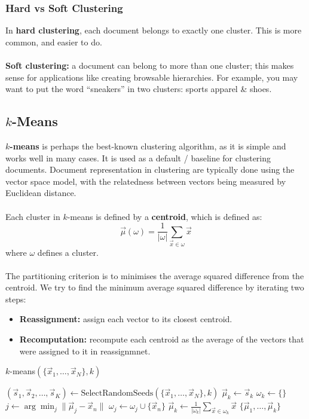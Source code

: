 \documentclass[a4paper,11pt]{article}
\begin{document}
\subsubsection{Hard vs Soft Clustering}
In \textbf{hard clustering}, each document belongs to exactly one cluster.
This is more common, and easier to do.
\\\\
\textbf{Soft clustering:} a document can belong to more than one cluster;
this makes sense for applications like creating browsable hierarchies.
For example, you may want to put the word ``sneakers'' in two clusters: sports apparel \& shoes.

\subsection{$k$-Means}
\textbf{$k$-means} is perhaps the best-known clustering algorithm, as it is simple and works well in many cases.
It is used as a default / baseline for clustering documents.
Document representation in clustering are typically done using the vector space model, with the relatedness between vectors being measured by Euclidean distance.
\\\\
Each cluster in $k$-means is defined by a \textbf{centroid}, which is defined as:
\[
    \overrightarrow{\mu}(\omega) = \frac{1}{| \omega | }\sum_{\overrightarrow{x} \in \omega} \overrightarrow{x}
\]
where $\omega$ defines a cluster.
\\\\
The partitioning criterion is to minimises the average squared difference from the centroid.
We try to find the minimum average squared difference by iterating two steps:
\begin{itemize}
    \item   \textbf{Reassignment:} assign each vector to its closest centroid.
    \item   \textbf{Recomputation:} recompute each centroid as the average of the vectors that were assigned to it in reassignmnet.
\end{itemize}

\begin{algorithm}[H]
\caption{$k$-means$ (\{ \vec{x}_1, \ldots, \vec{x}_N \}, k)$}
\begin{algorithmic}[1]
    \State $(\vec{s}_1, \vec{s}_2, \ldots, \vec{s}_K) \gets \text{SelectRandomSeeds}(\{ \vec{x}_1, \ldots, \vec{x}_N \}, k)$
        \State $\vec{\mu}_k \gets \vec{s}_k$
    \EndFor
            \State $\omega_k \gets \{\}$
        \EndFor
            \State $j \gets \arg \min_j \| \vec{\mu}_j - \vec{x}_n \|$
            \State $\omega_j \gets \omega_j \cup \{ \vec{x}_n \}$ 
        \EndFor
            \State $\vec{\mu}_k \gets \frac{1}{|\omega_k|} \sum_{\vec{x} \in \omega_k} \vec{x}$ 
        \EndFor
    \EndWhile
    \State \Return $\{\vec{\mu}_1, \ldots, \vec{\mu}_k\}$
\end{algorithmic}
\end{algorithm}
\end{document}
